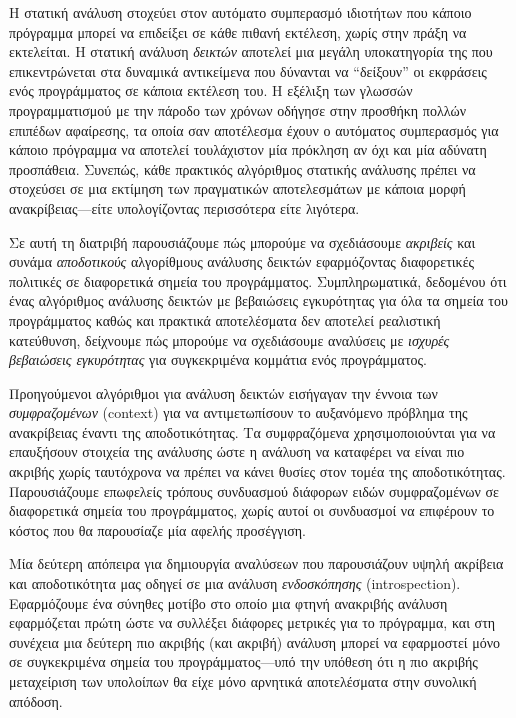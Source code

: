 Η στατική ανάλυση στοχεύει στον αυτόματο συμπερασμό ιδιοτήτων που κάποιο πρόγραμμα μπορεί να επιδείξει σε κάθε πιθανή εκτέλεση, χωρίς στην πράξη να εκτελείται. Η στατική ανάλυση \emph{δεικτών} αποτελεί μια μεγάλη υποκατηγορία της που επικεντρώνεται στα δυναμικά αντικείμενα που δύνανται να ``δείξουν'' οι εκφράσεις ενός προγράμματος σε κάποια εκτέλεση του. Η εξέλιξη των γλωσσών προγραμματισμού με την πάροδο των χρόνων οδήγησε στην προσθήκη πολλών επιπέδων αφαίρεσης, τα οποία σαν αποτέλεσμα έχουν ο αυτόματος συμπερασμός για κάποιο πρόγραμμα να αποτελεί τουλάχιστον μία πρόκληση αν όχι και μία αδύνατη προσπάθεια. Συνεπώς, κάθε πρακτικός αλγόριθμος στατικής ανάλυσης πρέπει να στοχεύσει σε μια εκτίμηση των πραγματικών αποτελεσμάτων με κάποια μορφή ανακρίβειας---είτε υπολογίζοντας περισσότερα είτε λιγότερα.

Σε αυτή τη διατριβή παρουσιάζουμε πώς μπορούμε να σχεδιάσουμε \emph{ακριβείς} και συνάμα \emph{αποδοτικούς} αλγορίθμους ανάλυσης δεικτών εφαρμόζοντας διαφορετικές πολιτικές σε διαφορετικά σημεία του προγράμματος. Συμπληρωματικά, δεδομένου ότι ένας αλγόριθμος ανάλυσης δεικτών με βεβαιώσεις εγκυρότητας για όλα τα σημεία του προγράμματος καθώς και πρακτικά αποτελέσματα δεν αποτελεί ρεαλιστική κατεύθυνση, δείχνουμε πώς μπορούμε να σχεδιάσουμε αναλύσεις με \emph{ισχυρές βεβαιώσεις εγκυρότητας} για συγκεκριμένα κομμάτια ενός προγράμματος.

Προηγούμενοι αλγόριθμοι για ανάλυση δεικτών εισήγαγαν την έννοια των \emph{συμφραζομένων} ({\en context}) για να αντιμετωπίσουν το αυξανόμενο πρόβλημα της ανακρίβειας έναντι της αποδοτικότητας. Τα συμφραζόμενα χρησιμοποιούνται για να επαυξήσουν στοιχεία της ανάλυσης ώστε η ανάλυση να καταφέρει να είναι πιο ακριβής χωρίς ταυτόχρονα να πρέπει να κάνει θυσίες στον τομέα της αποδοτικότητας. Παρουσιάζουμε επωφελείς τρόπους συνδυασμού διάφορων ειδών συμφραζομένων σε διαφορετικά σημεία του προγράμματος, χωρίς αυτοί οι συνδυασμοί να επιφέρουν το κόστος που θα παρουσίαζε μία αφελής προσέγγιση.

Μία δεύτερη απόπειρα για δημιουργία αναλύσεων που παρουσιάζουν υψηλή ακρίβεια και αποδοτικότητα μας οδηγεί σε μια ανάλυση \emph{ενδοσκόπησης} ({\en introspection}). Εφαρμόζουμε ένα σύνηθες μοτίβο στο οποίο μια φτηνή ανακριβής ανάλυση εφαρμόζεται πρώτη ώστε να συλλέξει διάφορες μετρικές για το πρόγραμμα, και στη συνέχεια μια δεύτερη πιο ακριβής (και ακριβή) ανάλυση μπορεί να εφαρμοστεί μόνο σε συγκεκριμένα σημεία του προγράμματος---υπό την υπόθεση ότι η πιο ακριβής μεταχείριση των υπολοίπων θα είχε μόνο αρνητικά αποτελέσματα στην συνολική απόδοση.

